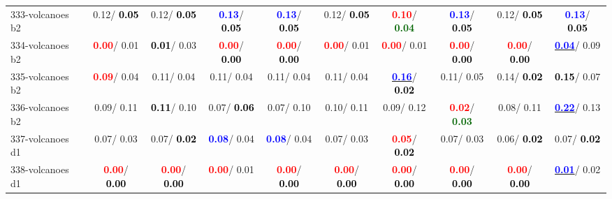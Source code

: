 \begin{table}[h]
\begin{center}
{\begin{tabular}{lc|c|c|c|c|c|c|c|c}
333-volcanoes b2 &   0.12/\textcolor{black}{\textbf{  0.05}} &   0.12/\textcolor{black}{\textbf{  0.05}} & \textcolor{blue}{\textbf{  0.13}}/\textcolor{black}{\textbf{  0.05}} & \textcolor{blue}{\textbf{  0.13}}/\textcolor{black}{\textbf{  0.05}} &   0.12/\textcolor{black}{\textbf{  0.05}} & \textcolor{red}{\textbf{  0.10}}/\textcolor{darkgreen}{\textbf{  0.04}} & \textcolor{blue}{\textbf{  0.13}}/\textcolor{black}{\textbf{  0.05}} &   0.12/\textcolor{black}{\textbf{  0.05}} & \textcolor{blue}{\textbf{  0.13}}/\textcolor{black}{\textbf{  0.05}} \\
334-volcanoes b2 & \textcolor{red}{\textbf{  0.00}}/  0.01 & \textcolor{black}{\textbf{  0.01}}/  0.03 & \textcolor{red}{\textbf{  0.00}}/\textcolor{black}{\textbf{  0.00}} & \textcolor{red}{\textbf{  0.00}}/\textcolor{black}{\textbf{  0.00}} & \textcolor{red}{\textbf{  0.00}}/  0.01 & \textcolor{red}{\textbf{  0.00}}/  0.01 & \textcolor{red}{\textbf{  0.00}}/\textcolor{black}{\textbf{  0.00}} & \textcolor{red}{\textbf{  0.00}}/\textcolor{black}{\textbf{  0.00}} & \underline{\textcolor{blue}{\textbf{  0.04}}}/  0.09 \\ \hline
335-volcanoes b2 & \textcolor{red}{\textbf{  0.09}}/  0.04 &   0.11/  0.04 &   0.11/  0.04 &   0.11/  0.04 &   0.11/  0.04 & \underline{\textcolor{blue}{\textbf{  0.16}}}/\textcolor{black}{\textbf{  0.02}} &   0.11/  0.05 &   0.14/\textcolor{black}{\textbf{  0.02}} & \textcolor{black}{\textbf{  0.15}}/  0.07 \\
336-volcanoes b2 &   0.09/  0.11 & \textcolor{black}{\textbf{  0.11}}/  0.10 &   0.07/\textcolor{black}{\textbf{  0.06}} &   0.07/  0.10 &   0.10/  0.11 &   0.09/  0.12 & \textcolor{red}{\textbf{  0.02}}/\textcolor{darkgreen}{\textbf{  0.03}} &   0.08/  0.11 & \underline{\textcolor{blue}{\textbf{  0.22}}}/  0.13 \\
337-volcanoes d1 &   0.07/  0.03 &   0.07/\textcolor{black}{\textbf{  0.02}} & \textcolor{blue}{\textbf{  0.08}}/  0.04 & \textcolor{blue}{\textbf{  0.08}}/  0.04 &   0.07/  0.03 & \textcolor{red}{\textbf{  0.05}}/\textcolor{black}{\textbf{  0.02}} &   0.07/  0.03 &   0.06/\textcolor{black}{\textbf{  0.02}} &   0.07/\textcolor{black}{\textbf{  0.02}} \\
338-volcanoes d1 & \textcolor{red}{\textbf{  0.00}}/\textcolor{black}{\textbf{  0.00}} & \textcolor{red}{\textbf{  0.00}}/\textcolor{black}{\textbf{  0.00}} & \textcolor{red}{\textbf{  0.00}}/  0.01 & \textcolor{red}{\textbf{  0.00}}/\textcolor{black}{\textbf{  0.00}} & \textcolor{red}{\textbf{  0.00}}/\textcolor{black}{\textbf{  0.00}} & \textcolor{red}{\textbf{  0.00}}/\textcolor{black}{\textbf{  0.00}} & \textcolor{red}{\textbf{  0.00}}/\textcolor{black}{\textbf{  0.00}} & \textcolor{red}{\textbf{  0.00}}/\textcolor{black}{\textbf{  0.00}} & \underline{\textcolor{blue}{\textbf{  0.01}}}/  0.02 \\

\end{tabular}}
\end{center}
\end{table}
